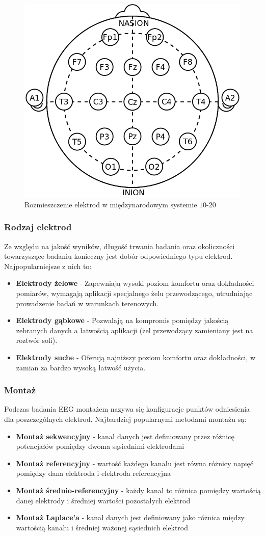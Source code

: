 \documentclass{./assets/wfis}
\begin{document}
\begin{figure}[h]
    \centering
    \includegraphics[width=0.5\columnwidth]{thesis/assets/10-20_system_electrodes.png}
    \caption{Rozmieszczenie elektrod w międzynarodowym systemie $10$-$20$}
    \label{fig:10-20-system}
\end{figure}

\subsubsection{Rodzaj elektrod}
Ze względu na jakość wyników, długość trwania badania oraz okoliczności towarzyszące badaniu konieczny jest dobór odpowiedniego typu elektrod. Najpopularniejsze z nich to:

\begin{itemize}
    \item \textbf{Elektrody żelowe} - Zapewniają wysoki poziom komfortu oraz dokładności pomiarów, wymagają aplikacji specjalnego żelu przewodzącego, utrudniając prowadzenie badań w warunkach terenowych.
    \item \textbf{Elektrody gąbkowe} - Pozwalają na kompromis pomiędzy jakością zebranych danych a łatwością aplikacji (żel przewodzący zamieniany jest na roztwór soli).
    \item \textbf{Elektrody suche} - Oferują najniższy poziom komfortu oraz dokładności, w zamian za bardzo wysoką łatwość użycia.
\end{itemize}

\subsubsection{Montaż}
Podczas badania EEG montażem nazywa się konfiguracje punktów odniesienia dla poszczególnych elektrod. Najbardziej popularnymi metodami montażu są:
\begin{itemize}
    \item \textbf{Montaż sekwencyjny} - kanał danych jest definiowany przez różnicę potencjałów pomiędzy dwoma sąsiednimi elektrodami
    \item \textbf{Montaż referencyjny} - wartość każdego kanału jest równa różnicy napięć pomiędzy dana elektroda i elektroda referencyjna
    \item \textbf{Montaż średnio-referencyjny} - każdy kanał to różnica pomiędzy wartością danej elektrody i średniej wartości pozostałych elektrod 
    \item \textbf{Montaż Laplace’a} -  kanał danych jest definiowany jako różnica między wartością kanału i średniej ważonej sąsiednich elektrod
\end{itemize}
\end{document}
